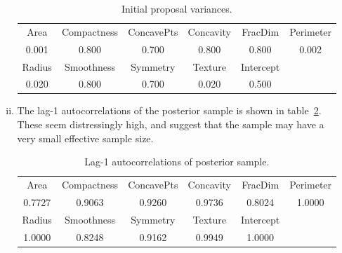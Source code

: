 \begin{enumerate}
\begin{enumerate}[i)]
        \begin{table}[bt]
        \begin{tabular}{cccccc}
        \toprule
        Area & Compactness & ConcavePts & Concavity & FracDim & Perimeter \\
        0.001 &  0.800 &  0.700 & 0.800 & 0.800 & 0.002 \\
        \midrule
        Radius & Smoothness & Symmetry & Texture & Intercept & \\ 
        0.020 & 0.800 & 0.700 & 0.020 & 0.500 & \\
        \bottomrule
        \end{tabular}
        \caption{
            Initial proposal variances.
        }
        \label{tab:var}
        \end{table}

    \FloatBlock
    \item
    The lag-1 autocorrelations of the posterior sample is shown in 
    table~\ref{tab:ac}.
    These seem distressingly high, and suggest that the sample may have a very
    small effective sample size.
        \begin{table}[hbt]
        \begin{tabular}{cccccc}
        \toprule
        Area & Compactness & ConcavePts & Concavity & FracDim & Perimeter \\
        0.7727 & 0.9063 & 0.9260 & 0.9736 & 0.8024 & 1.0000 \\
        \midrule
        Radius & Smoothness & Symmetry & Texture & Intercept & \\ 
        1.0000 & 0.8248 & 0.9162 & 0.9949 & 1.0000 & \\
        \bottomrule
        \end{tabular}
        \caption{
            Lag-1 autocorrelations of posterior sample.
        }
        \label{tab:ac}
        \end{table}


\end{enumerate}
\end{enumerate}
